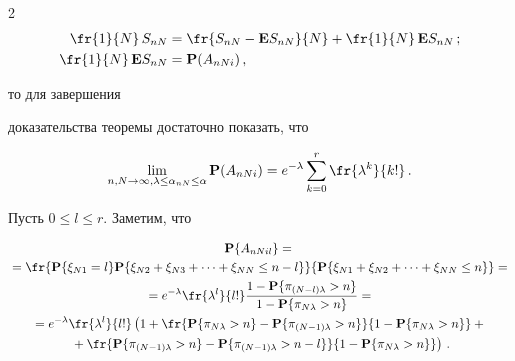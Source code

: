 \begin{multicols}{2}
\begin{align*}


\fr{1}{N}\,S_{nN}&=\fr{S_{nN}-\mathbf{E}S_{nN}}{N}+\fr{1}{N}\,\mathbf{E}S_{nN}\,;\\


\fr{1}{N}\,\mathbf{E}S_{nN}&=\mathbf{P}(A_{nNi})\,,


\end{align*}


 то для завершения


доказательства теоремы достаточно показать, что


\begin{equation}


\lim_{n, N\to\infty,


\lambda\le\alpha_{nN}\le\alpha}\mathbf{P}(A_{nNi})=


e^{-\lambda}\sum_{k=0}^r\fr{\lambda^k}{k!}\,. \label{e15-chu}


\end{equation}





Пусть $0\le l\le r$. Заметим, что


\begin{multline}


\mathbf{P}\{A_{nNil}\} ={}\\


{}=\fr{\mathbf{P}\{\xi_{N1}=l\}\mathbf{P}\{


 \xi_{N2}+\xi_{N3}+ \dots +\xi_{NN}\le n-l\}}{\mathbf{P}\{


 \xi_{N1}+\xi_{N2}+ \dots +\xi_{NN}\le n\}}={}\\


 {}=


e^{-\lambda}\fr{\lambda^l}{l!}\frac{1-\mathbf{P}


\{\pi_{(N-l)\lambda}>n\}}{1-\mathbf{P}\{\pi_{N\lambda}>n\}}={}\\


{}= 


e^{-\lambda}\fr{\lambda^l}{l!}\left(1+\fr{\mathbf{P}


\{\pi_{N\lambda}>n\}-\mathbf{P}\{\pi_{(N-1)\lambda}>n\}}{1-\mathbf{P}


\{\pi_{N\lambda}>n\}}+{}\right.\\


\left.{}+\fr{\mathbf{P}\{\pi_{(N-1)\lambda}>n\}-\mathbf{P}


\{\pi_{(N-1)\lambda}>n-l\}}{1-\mathbf{P}\{\pi_{N\lambda}>n\}}\right)\,.



\end{multline}
\end{multicols}
